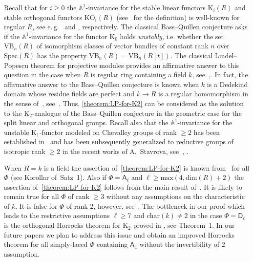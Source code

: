 \documentclass[oneside, 11pt]{amsart}
\numberwithin{equation}{section}
\newcommand{\K}{{\mathrm{K}}}
\theoremstyle{definition}
\theoremstyle{definition}
\theoremstyle{remark}
\newcommand{\rA}{\mathsf{A}}
\newcommand{\rD}{\mathsf{D}}
\begin{document}
Recall that for $i \geq 0$ the $\mathbb{A}^1$-invariance for the stable linear functors $\K_i(R)$ and stable orthogonal functors $\mathrm{KO}_i(R)$ (see~\cite{Ho05} for the definition) is well-known for regular $R$, see e.\,g.~\cite[Theorem~V.6.3]{Kbook} and \cite[Corollary~1.12]{Ho05}, respectively. The classical Bass--Quillen conjecture asks if the $\mathbb{A}^1$-invariance for the functor $\K_0$ holds {\it unstably}, i.e. whether the set $\mathrm{VB}_n(R)$ of isomorphism classes of vector bundles of constant rank $n$ over $\mathrm{Spec}(R)$ has the property $\mathrm{VB}_n(R) = \mathrm{VB}_n(R[t])$. 
The classical Lindel--Popescu theorem for projective modules provides an affirmative answer to this question in the case when $R$ is regular ring containing a field $k$, see~\cite[\S~VIII.6]{Lam10},\cite{Li81, Po85}. In fact, the affirmative answer to the Bass--Quillen conjecture is known when $k$ is a Dedekind domain whose residue fields are perfect and $k \to R$ is a regular homomorphism in the sense of~\cite[\S~1]{Sw98}, see~\cite[Theorem~5.2.1]{AHW17}.
Thus, \cref{theorem:LP-for-K2} can be considered as the solution to the $\K_2$-analogue of the Bass--Quillen conjecture in the geometric case for the split linear and orthogonal groups.
Recall also that the $\mathbb{A}^1$-invariance for the unstable $\K_1$-functor modeled on Chevalley groups of rank $\geq 2$ has been established in~\cite{Abe83} and has been subsequently generalized to reductive groups of isotropic rank $\geq 2$ in the recent works of A.~Stavrova, see~\cite[Theorem~1.3]{Sta14}, \cite[Theorem~1.1]{Sta20}.

When $R=k$ is a field the assertion of~\cref{theorem:LP-for-K2} is known from~\cite{Re75} for all $\Phi$ (see Korollar of~Satz~1). Also if $\Phi = \rA_\ell$ and $\ell \geq \mathrm{max}(4, \mathrm{dim}(R) + 2)$ the assertion of~\cref{theorem:LP-for-K2} follows from the main result of~\cite{Tu83}. It is likely to remain true for all $\Phi$ of rank $\geq 3$ without any assumptions on the characteristic of $k$. It is false for $\Phi$ of rank $2$, however, see~\cite{We12}. The bottleneck in our proof which leads to the restrictive assumptions $\ell\geq 7$ and $\mathrm{char}(k)\neq 2$ in the case $\Phi=\rD_\ell$ is the orthogonal Horrocks theorem for $\K_2$ proved in \cite{LS20}, see Theorem~1. In our future papers we plan to address this issue and obtain an improved Horrocks theorem for all simply-laced $\Phi$ containing $\rA_4$ without the invertibility of $2$ assumption.
\end{document}
